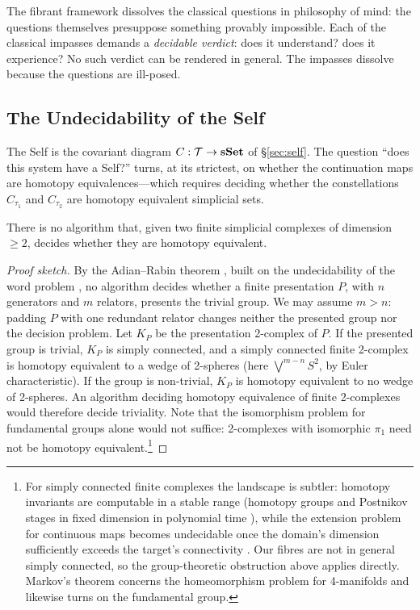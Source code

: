 The fibrant framework dissolves the classical questions in philosophy of mind: the questions themselves presuppose something provably impossible. Each of the classical impasses demands a \emph{decidable verdict}: does it understand? does it experience? No such verdict can be rendered in general. The impasses dissolve because the questions are ill-posed.


\subsection{The Undecidability of the Self}

The Self is the covariant diagram $C : \mathcal{T} \to \mathbf{sSet}$ of \S\ref{sec:self}. The question ``does this system have a Self?'' turns, at its strictest, on whether the continuation maps are homotopy equivalences---which requires deciding whether the constellations $C_{\tau_1}$ and $C_{\tau_2}$ are homotopy equivalent simplicial sets.

\begin{theorem}
\label{thm:undecidability}
There is no algorithm that, given two finite simplicial complexes of dimension $\geq 2$, decides whether they are homotopy equivalent.
\end{theorem}

\begin{proof}[Proof sketch]
By the Adian--Rabin theorem \cite{adian1955,rabin1958}, built on the undecidability of the word problem \cite{novikov1955algorithmic,boone1959}, no algorithm decides whether a finite presentation $P$, with $n$ generators and $m$ relators, presents the trivial group. We may assume $m > n$: padding $P$ with one redundant relator changes neither the presented group nor the decision problem. Let $K_P$ be the presentation 2-complex of $P$. If the presented group is trivial, $K_P$ is simply connected, and a simply connected finite 2-complex is homotopy equivalent to a wedge of 2-spheres (here $\bigvee^{m-n} S^2$, by Euler characteristic). If the group is non-trivial, $K_P$ is homotopy equivalent to no wedge of 2-spheres. An algorithm deciding homotopy equivalence of finite 2-complexes would therefore decide triviality. Note that the isomorphism problem for fundamental groups alone would not suffice: 2-complexes with isomorphic $\pi_1$ need not be homotopy equivalent.\footnote{For simply connected finite complexes the landscape is subtler: homotopy invariants are computable in a stable range (homotopy groups and Postnikov stages in fixed dimension in polynomial time \cite{cadek2014polynomial}), while the extension problem for continuous maps becomes undecidable once the domain's dimension sufficiently exceeds the target's connectivity \cite{cadek2014extendability}. Our fibres are not in general simply connected, so the group-theoretic obstruction above applies directly. Markov's theorem \cite{markov1958insolubility} concerns the homeomorphism problem for 4-manifolds and likewise turns on the fundamental group.}
\end{proof}

